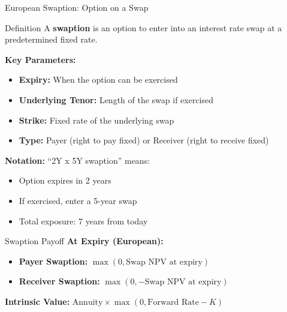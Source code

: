 \documentclass[aspectratio=169,11pt]{beamer}
\begin{document}
\begin{frame}{European Swaption: Option on a Swap}
\begin{block}{Definition}
A \textbf{swaption} is an option to enter into an interest rate swap at a predetermined fixed rate.
\end{block}

\textbf{Key Parameters:}
\begin{itemize}
    \item \textbf{Expiry:} When the option can be exercised
    \item \textbf{Underlying Tenor:} Length of the swap if exercised
    \item \textbf{Strike:} Fixed rate of the underlying swap
    \item \textbf{Type:} Payer (right to pay fixed) or Receiver (right to receive fixed)
\end{itemize}

\textbf{Notation:} ``2Y x 5Y swaption'' means:
\begin{itemize}
    \item Option expires in 2 years
    \item If exercised, enter a 5-year swap
    \item Total exposure: 7 years from today
\end{itemize}
\end{frame}

\begin{frame}{Swaption Payoff}
\textbf{At Expiry (European):}
\begin{itemize}
    \item \textbf{Payer Swaption:} $\max(0, \text{Swap NPV at expiry})$
    \item \textbf{Receiver Swaption:} $\max(0, -\text{Swap NPV at expiry})$
\end{itemize}

\begin{center}
\end{center}

\textbf{Intrinsic Value:} $\text{Annuity} \times \max(0, \text{Forward Rate} - K)$
\end{frame}
\end{document}
